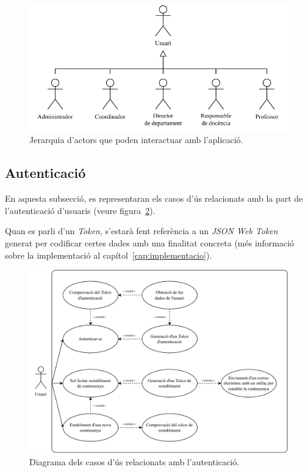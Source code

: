\documentclass[a4paper,12pt]{ThesisStyle}
\begin{document}
\begin{figure}[H]
  \centering
  \includegraphics[width=\textwidth]{assets/use_cases/actors.pdf}
  \caption{\label{img:casos_us_actors}Jerarquia d'actors que poden interactuar amb l'aplicació.}
\end{figure}

\newpage

\subsection{Autenticació}
\label{subsec:casos_us_auth}

En aquesta subsecció, es representaran els casos d'ús relacionats amb la part de l'autenticació d'usuaris (veure figura~\ref{img:casos_us_auth}).

Quan es parli d'un \textit{Token}, s'estarà fent referència a un \textit{JSON Web Token}~\cite{JWT} generat per codificar certes dades amb una finalitat concreta (més informació sobre la implementació al capítol~\ref{cap:implementacio}).

\begin{figure}[H]
  \centering
  \includegraphics[width=\textwidth]{assets/use_cases/auth.pdf}
  \caption{\label{img:casos_us_auth}Diagrama dels casos d'ús relacionats amb l'autenticació.}
\end{figure}
\end{document}
